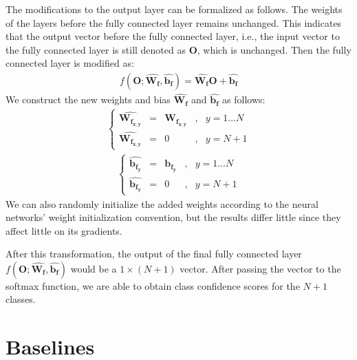 The modifications to the output layer can be formalized as follows. The weights of the layers before the fully connected layer remains unchanged. This indicates that the output vector before the fully connected layer, i.e., the input vector to the fully connected layer is still denoted as $\mathbf{O}$, which is unchanged. Then the fully connected layer is modified as:
\begin{align}
f(\mathbf{O}; \hat{\mathbf{W_f}}, \hat{\mathbf{b_f}}) =  \hat{\mathbf{W_f}}\mathbf{O} + \hat{\mathbf{b_f}}
\end{align}
We construct the new weights and bias $\hat{\mathbf{W_f}}$ and $\hat{\mathbf{b_f}}$ as follows:
\begin{align}
\left\{
	\begin{aligned}
	\hat{\mathbf{W_{f_{x,y}}}} & = & \mathbf{W_{f_{x,y}}}& ,& y = 1...N\\
	\hat{\mathbf{W_{f_{x,y}}}} & = & 0&,& y = N+1	
	\end{aligned}
\right.
\end{align}
\begin{align}
\left\{
\begin{aligned}
\hat{\mathbf{b_{f_{y}}}} & = & \mathbf{b_{f_{y}}}& ,& y = 1...N\\
\hat{\mathbf{b_{f_{y}}}} & = & 0&,& y = N+1	
\end{aligned}
\right.
\end{align}
We can also randomly initialize the added weights according to the neural networks' weight initialization convention, but the results differ little since they affect little on its gradients.

After this transformation, the output of the final fully connected layer $f(\mathbf{O}; \hat{\mathbf{W_f}}, \hat{\mathbf{b_f}})$ would be a $1\times (N+1)$ vector. After passing the vector to the softmax function, we are able to obtain class confidence scores for the $N+1$ classes.


\section{Baselines}


